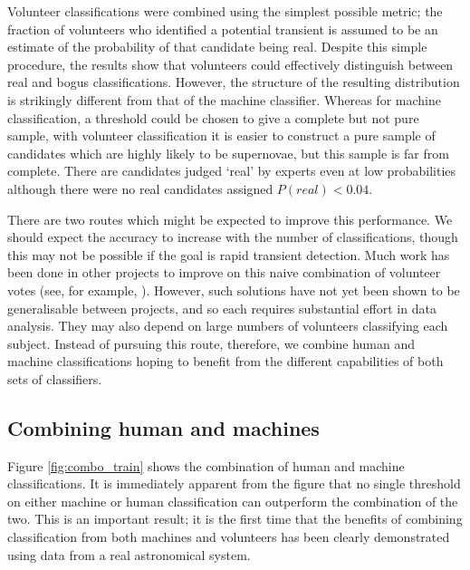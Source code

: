 \documentclass[a4paper,fleqn,usenatbib]{mnras}
\begin{document}
Volunteer classifications were combined using the simplest possible metric; the fraction of volunteers who identified a potential transient is assumed to be an estimate of the probability of that candidate being real. Despite this simple procedure, the results show that volunteers could effectively distinguish between real and bogus classifications. However, the structure of the resulting distribution is strikingly different from that of the machine classifier. Whereas for machine classification, a threshold could be chosen to give a complete but not pure sample, with volunteer classification it is easier to construct a pure sample of candidates which are highly likely to be supernovae, but this sample is far from complete. There are candidates judged `real' by experts even at low probabilities although there were no real candidates assigned $P(real) < 0.04$. 


There are two routes which might be expected to improve this performance. We should expect the accuracy to increase with the number of classifications, though this may not be possible if the goal is rapid transient detection. Much work has been done in other projects to improve on this naive combination of volunteer votes (see, for example, \citet{Schwamb12, Marshall16}). However, such solutions have not yet been shown to be generalisable between projects, and so each requires substantial effort in data analysis. They may also depend on large numbers of volunteers classifying each subject. Instead of pursuing this route, therefore, we combine human and machine classifications hoping to benefit from the different capabilities of both sets of classifiers. 

\subsection{Combining human and machines} 

Figure \ref{fig:combo_train} shows the combination of human and machine classifications. It is immediately apparent from the figure that no single threshold on either machine or human classification can outperform the combination of the two. This is an important result; it is the first time that the benefits of combining classification from both machines and volunteers has been clearly demonstrated using data from a real astronomical system. 
\end{document}
